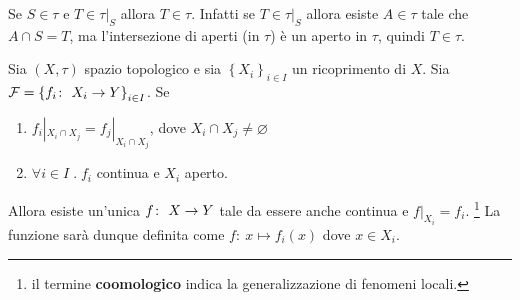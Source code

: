 \begin{remark}
	Se $S \in \tau$ e $T \in \tau|_S$ allora $T \in \tau$. Infatti se $T \in \tau|_S$ allora esiste $A \in \tau$ tale che $A \cap S = T$, ma l'intersezione di aperti (in $\tau$) è un aperto in $\tau$, quindi $T \in \tau$.
\end{remark}

\begin{theorem}
	Sia $(X,\tau)$ spazio topologico e sia $\left\{X_i\right\}_{i \in I}$ un ricoprimento di $X$. Sia $\mathcal{F} = \left\{ f_i \colon\ X_i \rightarrow Y\right\}_{i \in I}$. Se 
	\begin{enumerate}
		\item $f_i|_{X_i \cap X_j} = f_j|_{X_i \cap X_j}$, dove $X_i \cap X_j \neq \varnothing$
		\item $\forall i \in I \; . \; f_i$ continua e $X_i$ aperto.
	\end{enumerate}
	Allora esiste un'unica $f \colon\ X \rightarrow Y$ tale da essere anche continua e $f|_{X_i} = f_i$. \footnote{il termine \textbf{coomologico} indica la generalizzazione di fenomeni locali.}
	La funzione sarà dunque definita come $f \colon\ x \mapsto f_i(x)$ dove $x \in X_i$.
\end{theorem}

